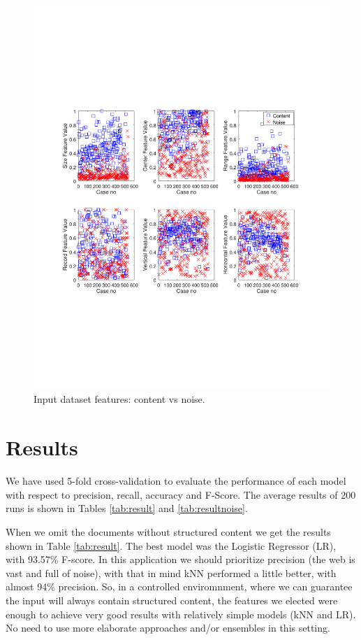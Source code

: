 \begin{figure}[h]
  \centering
     \includegraphics[trim={2.0cm 7.4cm 0.7cm 7.4cm}, clip,  width=\columnwidth]{img/dataset.pdf}
  \caption{Input dataset features: content vs noise.}
  \label{fig:dataset}
\end{figure}

\section{Results}\label{sec:results}
We have used 5-fold cross-validation to evaluate the performance
of each model with respect to precision, recall, accuracy and F-Score. The
average results of 200 runs is shown in Tables \ref{tab:result} and
\ref{tab:resultnoise}.

When we omit the documents without structured content we get the results
shown in Table \ref{tab:result}. The best model was the Logistic Regressor (LR),
with 93.57\% F-score. In this application we should prioritize precision
(the web is vast and full of noise), with that in mind kNN performed a little
better, with almost 94\% precision. So, in a controlled enviromnment, where we
can guarantee the input will always contain structured content, the features we
elected were enough to achieve very good results with relatively simple models
(kNN and LR). No need to use more elaborate approaches and/or ensembles in this
setting.

